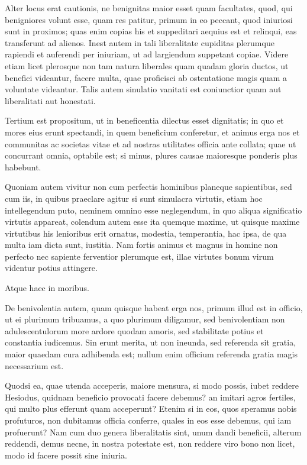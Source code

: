  

 Alter locus erat cautionis, ne benignitas maior esset quam facultates, quod, qui benigniores volunt esse, quam res patitur, primum in eo peccant, quod iniuriosi sunt in proximos; quas enim copias his et suppeditari aequius est et relinqui, eas transferunt ad alienos. Inest autem in tali liberalitate cupiditas plerumque rapiendi et auferendi per iniuriam, ut ad largiendum suppetant copiae. Videre etiam licet plerosque non tam natura liberales quam quadam gloria ductos, ut benefici videantur, facere multa, quae proficisci ab ostentatione magis quam a voluntate videantur. Talis autem sinulatio vanitati est coniunctior quam aut liberalitati aut honestati.
 

 Tertium est propositum, ut in beneficentia dilectus esset dignitatis; in quo et mores eius erunt spectandi, in quem beneficium conferetur, et animus erga nos et communitas ac societas vitae et ad nostras utilitates officia ante collata; quae ut concurrant omnia, optabile est; si minus, plures causae maioresque ponderis plus habebunt.
 

 Quoniam autem vivitur non cum perfectis hominibus planeque sapientibus, sed cum iis, in quibus praeclare agitur si sunt simulacra virtutis, etiam hoc intellegendum puto, neminem omnino esse neglegendum, in quo aliqua significatio virtutis appareat, colendum autem esse ita quemque maxime, ut quisque maxime virtutibus his lenioribus erit ornatus, modestia, temperantia, hac ipsa, de qua multa iam dicta sunt, iustitia. Nam fortis animus et magnus in homine non perfecto nec sapiente ferventior plerumque est, illae virtutes bonum virum videntur potius attingere.

Atque haec in moribus.
 

 De benivolentia autem, quam quisque habeat erga nos, primum illud est in officio, ut ei plurimum tribuamus, a quo plurimum diligamur, sed benivolentiam non adulescentulorum more ardore quodam amoris, sed stabilitate potius et constantia iudicemus. Sin erunt merita, ut non ineunda, sed referenda sit gratia, maior quaedam cura adhibenda est; nullum enim officium referenda gratia magis necessarium est.
 

 Quodsi ea, quae utenda acceperis, maiore mensura, si modo possis, iubet reddere Hesiodus, quidnam beneficio provocati facere debemus? an imitari agros fertiles, qui multo plus efferunt quam acceperunt? Etenim si in eos, quos speramus nobis profuturos, non dubitamus officia conferre, quales in eos esse debemus, qui iam profuerunt? Nam cum duo genera liberalitatis sint, unum dandi beneficii, alterum reddendi, demus necne, in nostra potestate est, non reddere viro bono non licet, modo id facere possit sine iniuria.

